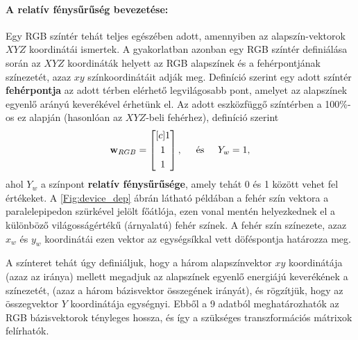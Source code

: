 \paragraph{A relatív fénysűrűség bevezetése:\\}
Egy RGB színtér tehát teljes egészében adott, amennyiben az alapszín-vektorok $XYZ$ koordinátái ismertek.
A gyakorlatban azonban egy RGB színtér definiálása során az $XYZ$ koordináták helyett az RGB alapszínek és a fehérpontjának színezetét, azaz $xy$ színkoordinátáit adják meg.
Definíció szerint egy adott színtér \textbf{fehérpontja} az adott térben elérhető legvilágosabb pont, amelyet az alapszínek egyenlő arányú keverékével érhetünk el.
Az adott eszközfüggő színtérben a 100\%-os ez alapján (hasonlóan az $XYZ$-beli fehérhez), definíció szerint 
\begin{equation}
\mathbf{w}_{RGB} = \begin{bmatrix}[c]
       1 \\[0.3em]
       1 \\[0.3em]
       1 \end{bmatrix}, \hspace{5mm} \text{és} \hspace{5mm} 
Y_w = 1,
\end{equation}
ahol $Y_w$ a színpont \textbf{relatív fénysűrűsége}, amely tehát 0 és 1 között vehet fel értékeket.
 A \ref{Fig:device_dep} ábrán látható példában a fehér szín vektora a paralelepipedon szürkével jelölt főátlója, ezen vonal mentén helyezkednek el a különböző világosságértékű (árnyalatú) fehér színek.
A fehér szín színezete, azaz $x_w$ és $y_w$ koordinátái ezen vektor az egységsíkkal vett döféspontja határozza meg.

A színteret tehát úgy definiáljuk, hogy a három alapszínvektor $xy$ koordinátája (azaz az iránya) mellett megadjuk az alapszínek egyenlő energiájú keverékének a színezetét, (azaz a három bázisvektor összegének irányát), és rögzítjük, hogy az összegvektor $Y$ koordinátája egységnyi.
Ebből a 9 adatból meghatározhatók az RGB bázisvektorok tényleges hossza, és így a szükséges transzformációs mátrixok felírhatók.

